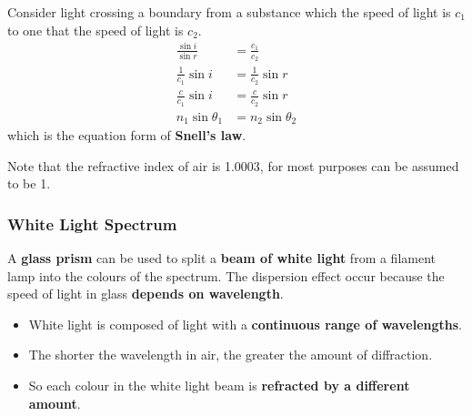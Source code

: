 Consider light crossing a boundary from a substance which the speed of light is $c_1$ to one that the speed of light is $c_2$.
\begin{align*}
    \frac{\sin i}{\sin r}&=\frac{c_1}{c_2}\\
    \frac{1}{c_1}\sin i&=\frac{1}{c_2}\sin r\\
    \frac{c}{c_1}\sin i&=\frac{c}{c_2}\sin r\\
    n_1\sin\theta_1&=n_2\sin\theta_2
\end{align*}
which is the equation form of \textbf{Snell's law}.

Note that the refractive index of air is 1.0003, for most purposes can be assumed to be 1.

\subsubsection*{White Light Spectrum}

A \textbf{glass prism} can be used to split a \textbf{beam of white light} from a filament lamp into the colours of the spectrum. The dispersion effect occur because the speed of light in glass \textbf{depends on wavelength}.
\begin{itemize}
    \item White light is composed of light with a \textbf{continuous range of wavelengths}.
    \item The shorter the wavelength in air, the greater the amount of diffraction.
    \item So each colour in the white light beam is \textbf{refracted by a different amount}.
\end{itemize}
